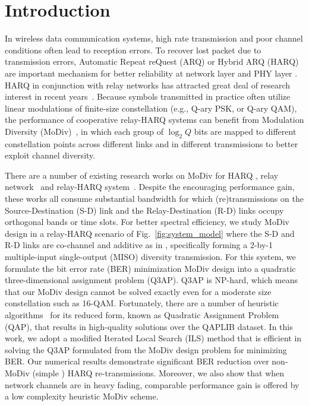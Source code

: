 \documentclass[journal,draftcls,onecolumn,12pt,twoside]{IEEEtran}
\begin{document}
\section{Introduction}
In wireless data communication systems, high rate transmission and poor channel
conditions often lead to reception errors. To recover lost packet due to
transmission errors, Automatic Repeat reQuest (ARQ) or Hybrid ARQ (HARQ) are
important mechanism for better reliability at network layer \cite{TS36.331} and
PHY layer \cite{TS36.213}. HARQ in conjunction with relay networks has attracted
great deal of research interest in recent years~\cite{ngo2014hybrid}. Because
symbols transmitted in practice often utilize linear modulations of finite-size
constellation (e.g., Q-ary PSK, or Q-ary QAM), the performance of cooperative
relay-HARQ systems can benefit from Modulation Diversity
(MoDiv)~\cite{benelli1992new}, in which each group of $\log_2 Q$ bits are mapped
to different constellation points across different links and in different
transmissions to better exploit channel diversity.

There are a number of existing research works on MoDiv for HARQ
\cite{harvind2005symbol}, relay network~\cite{seddik2008trans, khormuji2008rate}
and relay-HARQ system~\cite{kim2009design, ryu2011ber}. Despite the encouraging
performance gain, these works all consume substantial bandwidth for which
(re)transmissions on the Source-Destination (S-D) link and the Relay-Destination
(R-D) links occupy orthogonal bands or time slots. For better spectral
efficiency, we study MoDiv design in a relay-HARQ scenario of
Fig.~\ref{fig:system_model} where the S-D and R-D links are co-channel and
additive as in \cite{cover1979capacity, nabar2004fading}, specifically
forming a 2-by-1 multiple-input single-output (MISO) diversity transmission. 
For this system, we formulate the bit error rate (BER) minimization MoDiv
design into a quadratic three-dimensional assignment problem (Q3AP). 
Q3AP is NP-hard, which means that our MoDiv design cannot be solved exactly 
even for a moderate size constellation such as 16-QAM. Fortunately, there are
a number of heuristic algorithms~\cite{benlic2015memetic} for its reduced form,
known as Quadratic Assignment Problem (QAP), that results in high-quality
solutions over the QAPLIB dataset. In this work, we adopt a modified Iterated
Local Search (ILS) method that is efficient in solving the Q3AP formulated from
the  MoDiv design problem for minimizing BER. Our numerical results demonstrate
significant BER reduction over non-MoDiv (simple ) HARQ re-transmissions.
Moreover, we also show that when network channels are in heavy fading,
comparable performance gain is offered by a low complexity heuristic MoDiv scheme.
\end{document}
